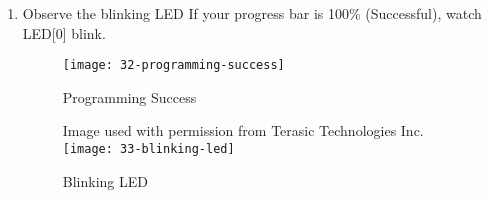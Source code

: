 \begin{flushleft}
\begin{enumerate}[
	label=\textbf{Step \arabic*.},
	leftmargin=*,
	widest={00},
	align=left]
\begin{enumerate}[
	label=\textbf{Step \arabic{enumi}\alph*.},
	leftmargin=*,
	align=left]
Here, \textbf{blink.sof} is your programming file. SRAM Object Files (.sof files) are binary files containing data for configuring SRAM-based devices, our FPGA is based on SRAM.  The Intel Quartus software Program Device (also called the Quartus Programmer) looks into the SOF file and gets the programming bit stream for the device.
\newline

\item Check the \textbf{Program/Configure} column, and then click \textbf{Start}.

\begin{figure}[H]
\centering
\texttt{[image: 31-start-programmer]}
\caption{Start Programming}
\label{fig:31-start-programmer}
\end{figure}

\end{enumerate}

\newpage

\item Observe the blinking LED
\newline
\newline
If your progress bar is 100\% (Successful), watch LED[0] blink.

\begin{figure}[H]
\centering
\texttt{[image: 32-programming-success]}
\caption{Programming Success}
\label{fig:32-programming-success}
\end{figure}

\begin{figure}[H]
\centering
\scriptsize{Image used with permission from Terasic Technologies Inc.}
\newline
\texttt{[image: 33-blinking-led]}
\caption{Blinking LED}
\label{fig:33-blinking-led}
\end{figure}

\end{enumerate}

\end{flushleft}

